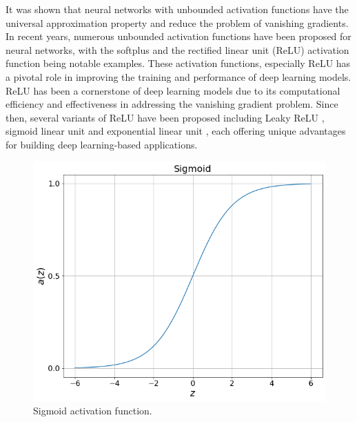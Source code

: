 \documentclass[preprint,12pt]{elsarticle}
\begin{document}
It was shown that neural networks with unbounded activation functions have the universal approximation property and reduce the problem of vanishing gradients. In recent years, numerous unbounded activation functions have been proposed for neural networks, with the softplus \citep{dugas_incorporating_2000} and the rectified linear unit (ReLU) \citep{glorot_deep_2011} activation function being notable examples. These activation functions, especially ReLU has a pivotal role in improving the training and performance of deep learning models. ReLU has been a cornerstone of deep learning models due to its computational efficiency and effectiveness in addressing the vanishing gradient problem. Since then, several variants of ReLU have been proposed including Leaky ReLU \citep{maas_rectifier_2013}, sigmoid linear unit \citep{misra_mish_2020} and exponential linear unit \citep{clevert_fast_2016}, each offering unique advantages for building deep learning-based applications. 

\begin{figure}
	\centering
		\includegraphics[scale=.25]{fig_activation_functions_sigmoid.png}
	\caption{Sigmoid activation function.}
	\label{fig_activation_functions_sigmoid}
\end{figure}
\end{document}
